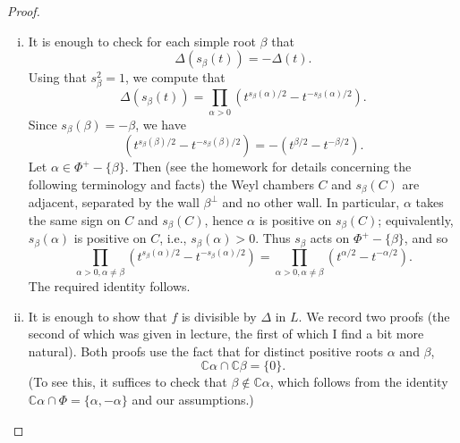 \documentclass[reqno]{amsart} 
\begin{document}
\begin{proof}
  \begin{enumerate}
[(i)]
  \item It is enough to check for each simple root $\beta$ that
    \begin{equation}\label{eq:}
      \Delta(s_\beta(t)) = - \Delta(t).
    \end{equation}
    Using that $s_\beta^2 =1$, we compute that
    \begin{equation}\label{eq:}
      \Delta(s_\beta(t))
      =
      \prod_{\alpha>0}
      (t^{s_\beta(\alpha)/2}
      - t^{-s_\beta(\alpha)/2}).
    \end{equation}
    Since $s_\beta(\beta) = -\beta$, we have
    \begin{equation}\label{eq:}
      (t^{s_\beta(\beta)/2}
      - t^{-s_\beta(\beta)/2})
      =
      -(t^{\beta/2} - t^{-\beta/2}).
    \end{equation}
    Let $\alpha \in \Phi^+ - \{\beta\}$.  Then (see the homework for details concerning the following terminology and facts) the Weyl chambers $C$ and $s_\beta(C)$ are adjacent, separated by the wall $\beta^\perp$ and no other wall.  In particular, $\alpha$ takes the same sign on $C$ and $s_\beta(C)$, hence $\alpha$ is positive on $s_\beta(C)$; equivalently, $s_\beta(\alpha)$ is positive on $C$, i.e., $s_\beta(\alpha) > 0$.  Thus $s_\beta$ acts on $\Phi^+ - \{\beta\}$, and so
    \begin{equation}\label{eq:}
      \prod_{\alpha>0, \alpha \neq \beta }
      (t^{s_\beta(\alpha)/2}
      - t^{-s_\beta(\alpha)/2})
      =
      \prod_{\alpha>0, \alpha \neq \beta }
      (t^{\alpha/2}
      - t^{-\alpha/2}).
    \end{equation}
    The required identity follows.
  \item It is enough to show that $f$ is divisible by $\Delta$ in $L$.  We record two proofs (the second of which was given in lecture, the first of which I find a bit more natural).  Both proofs use the fact that for distinct positive roots $\alpha$ and $\beta$,
    \begin{equation}\label{eq:C-alpha-not-C-beta}
      \mathbb{C} \alpha \cap \mathbb{C} \beta = \{0\}.
    \end{equation}
    (To see this, it suffices to check that $\beta \notin \mathbb{C} \alpha$, which follows from the identity $\mathbb{C} \alpha \cap \Phi = \{\alpha, - \alpha \}$ and our assumptions.)
    \begin{enumerate}

\end{enumerate}
\end{enumerate}
\end{proof}
\end{document}
